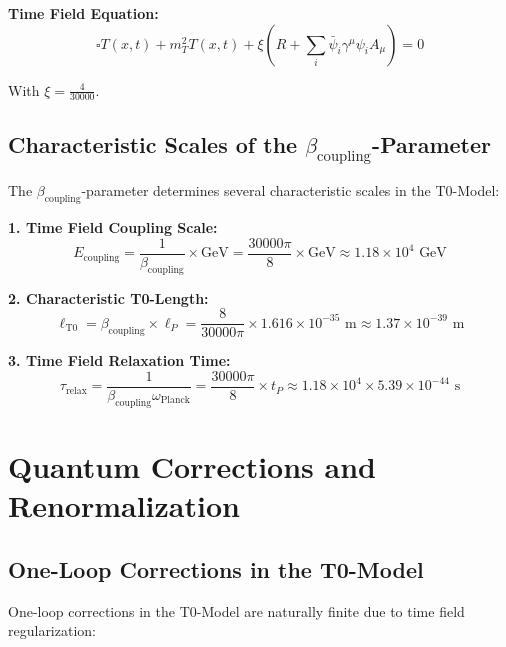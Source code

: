 \documentclass[12pt,a4paper]{report}
\newcommand{\Tfield}{T(x,t)}  %
\newcommand{\xipar}{\xi}      %
\begin{document}
	\textbf{Time Field Equation:}
	\begin{equation}\label{eq:timefield_equation_complete}
		\square \Tfield + m_T^2 \Tfield + \xipar \left(R + \sum_i \bar{\psi}_i \gamma^\mu \psi_i A_\mu\right) = 0
	\end{equation}
	
	With $\xipar = \frac{4}{30000}$.
	
	\subsection{Characteristic Scales of the $\beta_{\text{coupling}}$-Parameter}\label{subsec:characteristic_scales_beta}
	
	The $\beta_{\text{coupling}}$-parameter determines several characteristic scales in the T0-Model:
	
	\textbf{1. Time Field Coupling Scale:}
	\begin{equation}
		E_{\text{coupling}} = \frac{1}{\beta_{\text{coupling}}} \times \text{GeV} = \frac{30000\pi}{8} \times \text{GeV} \approx 1.18 \times 10^{4} \text{ GeV}
	\end{equation}
	
	\textbf{2. Characteristic T0-Length:}
	\begin{equation}
		\ell_{\text{T0}} = \beta_{\text{coupling}} \times \ell_P = \frac{8}{30000\pi} \times 1.616 \times 10^{-35} \text{ m} \approx 1.37 \times 10^{-39} \text{ m}
	\end{equation}
	
	\textbf{3. Time Field Relaxation Time:}
	\begin{equation}
		\tau_{\text{relax}} = \frac{1}{\beta_{\text{coupling}} \omega_{\text{Planck}}} = \frac{30000\pi}{8} \times t_P \approx 1.18 \times 10^{4} \times 5.39 \times 10^{-44} \text{ s}
	\end{equation}
	
	\section{Quantum Corrections and Renormalization}\label{sec:quantum_corrections_renormalization}
	
	\subsection{One-Loop Corrections in the T0-Model}\label{subsec:one_loop_corrections}

One-loop corrections in the T0-Model are naturally finite due to time field regularization:
\end{document}
